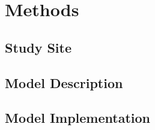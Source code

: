 \documentclass[draft]{agujournal2019}
\begin{document}

\section{Methods}

%
\subsection{Study Site}


\subsection{Model Description}


\subsection{Model Implementation}

\end{document}
